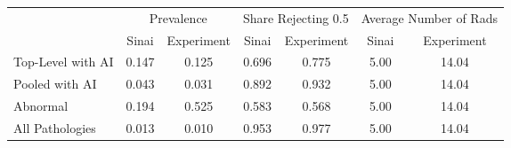 \begin{tabular}{lcccccc}
\toprule
 & \multicolumn{2}{c}{Prevalence} & \multicolumn{2}{c}{Share Rejecting 0.5} & \multicolumn{2}{c}{Average Number of Rads} \\
 & Sinai & Experiment & Sinai & Experiment & Sinai & Experiment \\
\midrule
Top-Level with AI & 0.147 & 0.125 & 0.696 & 0.775 & 5.00 & 14.04 \\
Pooled with AI & 0.043 & 0.031 & 0.892 & 0.932 & 5.00 & 14.04 \\
Abnormal & 0.194 & 0.525 & 0.583 & 0.568 & 5.00 & 14.04 \\
All Pathologies & 0.013 & 0.010 & 0.953 & 0.977 & 5.00 & 14.04 \\
\bottomrule
\end{tabular}
